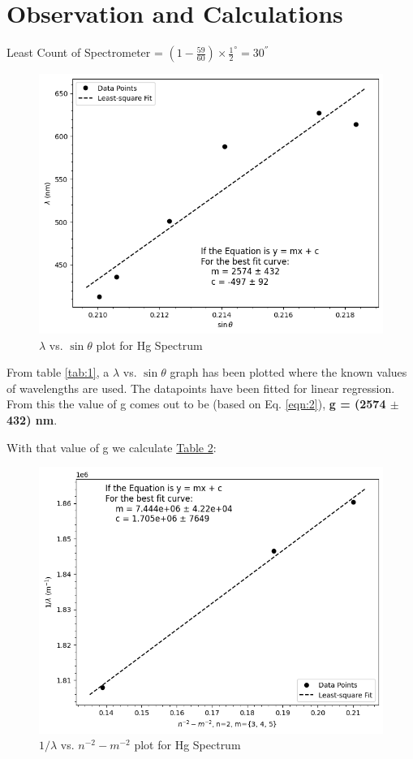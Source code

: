 \section{Observation and Calculations}

    Least Count of Spectrometer = $(1-\frac{59}{60})\times \frac{1}{2}^\circ = 30^{''}$

	
	\begin{figure}[H]
		\includegraphics[width=\columnwidth]{images/lambda_v_sin.png}
		\caption{$\lambda$ vs. $\sin \theta$ plot for Hg Spectrum}
		\label{fig:t1}
	\end{figure}

	From table \ref{tab:1}, a $\lambda$ vs. $\sin \theta$ graph has been plotted where the known values of wavelengths are used. The datapoints have been fitted for linear regression. From this the value of g comes out to be (based on Eq. \ref{eqn:2}), \textbf{g = (2574 $\pm$ 432) nm}.

	\vspace{5mm}
	\noindent With that value of g we calculate \hyperref[tab:2]{Table 2}:

	
	\begin{figure}[H]
		\includegraphics[width=\columnwidth]{images/ry_plot.png}
		\caption{$1/\lambda$ vs. $n^{-2}-m^{-2}$ plot for Hg Spectrum}
		\label{fig:t1}
	\end{figure}


